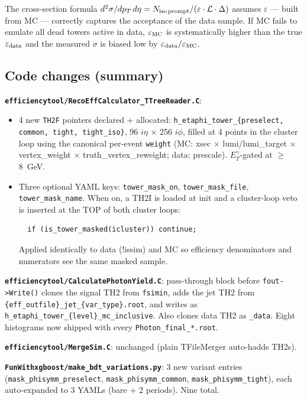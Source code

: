 \documentclass[11pt,a4paper]{article}
\newcommand{\etg}{\ensuremath{E_T^\gamma}}
\begin{document}
The cross-section formula
$d^2\sigma / dp_T\, d\eta = N_{\rm iso\,prompt}/(\varepsilon\cdot\mathcal{L}
\cdot \Delta)$ assumes $\varepsilon$ --- built from MC --- correctly
captures the acceptance of the data sample. If MC fails to emulate
all dead towers active in data, $\varepsilon_{\rm MC}$ is
systematically higher than the true $\varepsilon_{\rm data}$ and the
measured $\sigma$ is biased low by $\varepsilon_{\rm data} /
\varepsilon_{\rm MC}$.

\subsection{Code changes (summary)}

\textbf{\texttt{efficiencytool/RecoEffCalculator\_TTreeReader.C}}:
\begin{itemize}
  \item 4 new \texttt{TH2F} pointers declared + allocated:
  \texttt{h\_etaphi\_tower\_\{preselect, common, tight, tight\_iso\}},
  96 $i\eta$ $\times$ 256 $i\phi$, filled at 4 points in the cluster
  loop using the canonical per-event \texttt{weight} (MC: xsec
  $\times$ lumi/lumi\_target $\times$ vertex\_weight $\times$
  truth\_vertex\_reweight; data: prescale). \etg-gated at $\ge$ 8~GeV.
  \item Three optional YAML keys: \texttt{tower\_mask\_on},
  \texttt{tower\_mask\_file}, \texttt{tower\_mask\_name}. When on, a
  TH2I is loaded at init and a cluster-loop veto is inserted at the
  TOP of both cluster loops:
  \begin{verbatim}
  if (is_tower_masked(icluster)) continue;
  \end{verbatim}
  Applied identically to data (!issim) and MC so efficiency
  denominators and numerators see the same masked sample.
\end{itemize}

\textbf{\texttt{efficiencytool/CalculatePhotonYield.C}}: pass-through
block before \texttt{fout->Write()} clones the signal TH2 from
\texttt{fsimin}, adds the jet TH2 from
\texttt{\{eff\_outfile\}\_jet\_\{var\_type\}.root}, and writes as
\texttt{h\_etaphi\_tower\_\{level\}\_mc\_inclusive}. Also clones data
TH2 as \texttt{\_data}. Eight histograms now shipped with every
\texttt{Photon\_final\_*.root}.

\textbf{\texttt{efficiencytool/MergeSim.C}}: unchanged (plain
TFileMerger auto-hadds TH2s).

\textbf{\texttt{FunWithxgboost/make\_bdt\_variations.py}}: 3 new
variant entries (\texttt{mask\_phisymm\_preselect},
\texttt{mask\_phisymm\_common}, \texttt{mask\_phisymm\_tight}), each
auto-expanded to 3 YAMLs (bare + 2 periods). Nine total.
\end{document}
